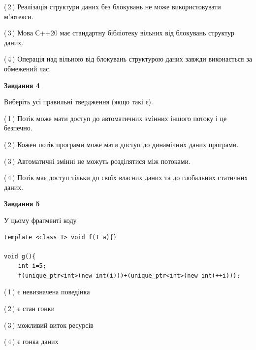 \documentclass[12pt, ukrainian]{article}
\begin{document}
\begin {large}
{(\,2\,) Реалізація структури даних без блокувань не може використовувати м’ютекси.%

(\,3\,) Мова С++20 має стандартну бібліотеку вільних від блокувань структур даних.%

(\,4\,) Операція над вільною від блокувань структурою даних завжди виконається за обмежений час.%



\begin{center}
\textbf{Завдання 4}
\end{center}
Виберіть усі правильні твердження (якщо такі є).\par
\vspace{2mm}

(\,1\,) Потік може мати доступ до автоматичних змінних іншого потоку і це безпечно.%

(\,2\,) Кожен потік програми може мати доступ до динамічних даних програми.%

(\,3\,) Автоматичні змінні не можуть розділятися між потоками.%

(\,4\,) Потік має доступ тільки до своїх власних даних та до глобальних статичних даних.%



\begin{center}
\textbf{Завдання 5}
\end{center}
У цьому фрагменті коду
\begin{verbatim}
template <class T> void f(T a){}

void g(){
    int i=5;
    f(unique_ptr<int>(new int(i)))+(unique_ptr<int>(new int(++i)));
\end{verbatim}
(\,1\,) є невизначена поведінка%

(\,2\,) є стан гонки%

(\,3\,) можливий виток ресурсів%

(\,4\,) є гонка даних%


}
\end {large}
\end{document}
